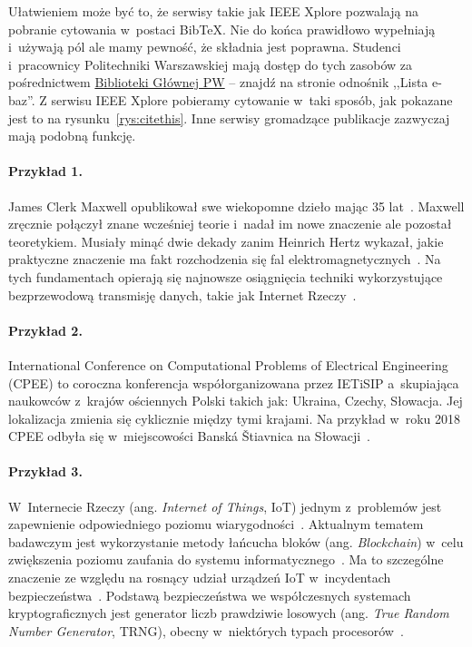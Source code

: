 Ułatwieniem może być to, że serwisy takie jak IEEE Xplore pozwalają na pobranie cytowania w~postaci BibTeX. Nie do końca prawidłowo wypełniają i~używają pól ale mamy pewność, że składnia jest poprawna. Studenci i~pracownicy Politechniki Warszawskiej mają dostęp do tych zasobów za pośrednictwem \href{https://bg.pw.edu.pl/}{Biblioteki Głównej PW} -- znajdź na stronie odnośnik ,,Lista e-baz''. Z serwisu IEEE Xplore pobieramy cytowanie w~taki sposób, jak pokazane jest to na rysunku~\ref{rys:citethis}. Inne serwisy gromadzące publikacje zazwyczaj mają podobną funkcję.

\paragraph{Przykład 1.}
James Clerk Maxwell opublikował swe wiekopomne dzieło mając 35 lat~\cite{maxwell1865}. Maxwell zręcznie połączył znane wcześniej teorie i~nadał im nowe znaczenie ale pozostał teoretykiem. Musiały minąć dwie dekady zanim Heinrich Hertz wykazał, jakie praktyczne znaczenie ma fakt rozchodzenia się fal elektromagnetycznych~\cite{cichon1995}. Na tych fundamentach opierają się najnowsze osiągnięcia techniki wykorzystujące bezprzewodową transmisję danych, takie jak Internet Rzeczy~\cite{lncsevo}.

\paragraph{Przykład 2.} International Conference on Computational Problems of Electrical Engineering (CPEE) to coroczna konferencja współorganizowana przez IETiSIP a~skupiająca naukowców z~krajów ościennych Polski takich jak: Ukraina, Czechy, Słowacja. Jej lokalizacja zmienia się cyklicznie między tymi krajami. Na przykład w~roku 2018 CPEE odbyła się w~miejscowości Banská Štiavnica na Słowacji~\cite{cpee2018}.

\paragraph{Przykład 3.} W~Internecie Rzeczy (ang. \textit{Internet of Things}, IoT) jednym z~problemów jest zapewnienie odpowiedniego poziomu wiarygodności~\cite{truong2018}. Aktualnym tematem badawczym jest wykorzystanie metody łańcucha bloków (ang. \textit{Blockchain}) w~celu zwiększenia poziomu zaufania do systemu informatycznego~\cite{poirier2020}. Ma to szczególne znaczenie ze względu na rosnący udział urządzeń IoT w~incydentach bezpieczeństwa~\cite{nask2020}. Podstawą bezpieczeństwa we współczesnych systemach kryptograficznych jest generator liczb prawdziwie losowych (ang. \textit{True Random Number Generator}, TRNG), obecny w~niektórych typach procesorów~\cite{AN4230}.

